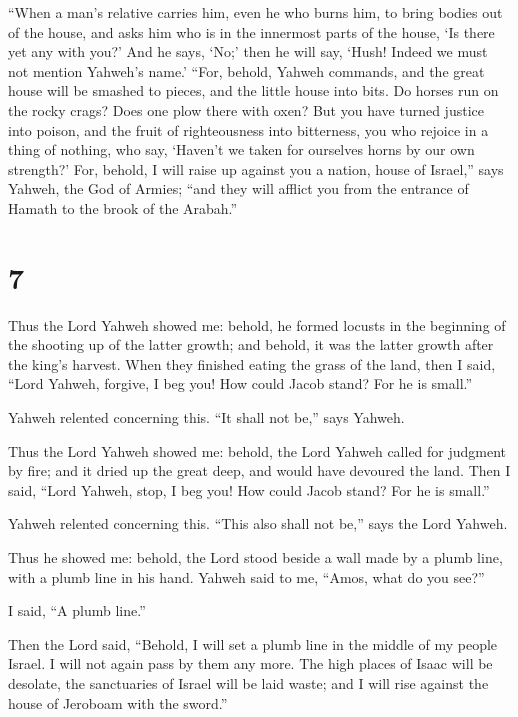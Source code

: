  ``When a man's relative carries him, even he who burns
him, to bring bodies out of the house, and asks him who is in the
innermost parts of the house, `Is there yet any with you?' And he says,
`No;' then he will say, `Hush! Indeed we must not mention Yahweh's
name.'  ``For, behold, Yahweh commands, and the great house
will be smashed to pieces, and the little house into bits. 
Do horses run on the rocky crags? Does one plow there with oxen? But you
have turned justice into poison, and the fruit of righteousness into
bitterness,  you who rejoice in a thing of nothing, who
say, `Haven't we taken for ourselves horns by our own strength?'
 For, behold, I will raise up against you a nation, house
of Israel,'' says Yahweh, the God of Armies; ``and they will afflict you
from the entrance of Hamath to the brook of the Arabah.''

\hypertarget{section-6}{%
\section{7}\label{section-6}}

 Thus the Lord Yahweh showed me: behold, he formed locusts
in the beginning of the shooting up of the latter growth; and behold, it
was the latter growth after the king's harvest.  When they
finished eating the grass of the land, then I said, ``Lord Yahweh,
forgive, I beg you! How could Jacob stand? For he is small.''

 Yahweh relented concerning this. ``It shall not be,'' says
Yahweh.

 Thus the Lord Yahweh showed me: behold, the Lord Yahweh
called for judgment by fire; and it dried up the great deep, and would
have devoured the land.  Then I said, ``Lord Yahweh, stop, I
beg you! How could Jacob stand? For he is small.''

 Yahweh relented concerning this. ``This also shall not
be,'' says the Lord Yahweh.

 Thus he showed me: behold, the Lord stood beside a wall
made by a plumb line, with a plumb line in his hand.  Yahweh
said to me, ``Amos, what do you see?''

I said, ``A plumb line.''

Then the Lord said, ``Behold, I will set a plumb line in the middle of
my people Israel. I will not again pass by them any more. 
The high places of Isaac will be desolate, the sanctuaries of Israel
will be laid waste; and I will rise against the house of Jeroboam with
the sword.''

